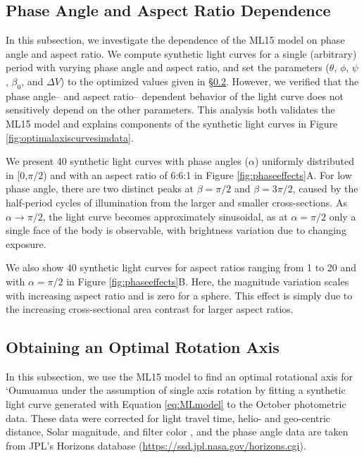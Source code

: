 \documentclass[twocolumn,doublespacing]{aastex631}
\begin{document}
\subsection{Phase Angle and Aspect Ratio Dependence}\label{subsec:phaseaspectanalysis}

In this subsection, we investigate the dependence of the ML15 model on phase angle and aspect ratio. We compute synthetic light curves for a single (arbitrary) period with varying phase angle and aspect ratio, and set the parameters ($\theta$, $\phi$, $\psi$, $\beta_0$, and $\Delta V$) to the optimized values given in \S \ref{subsec:gettingaxis}. However, we verified that the phase angle-- and aspect ratio-- dependent behavior of the light curve does not sensitively depend on the other parameters. This analysis both validates the ML15 model and explains components of the synthetic light curves in Figure \ref{fig:optimalaxiscurvesimdata}. 

We present 40 synthetic light curves with phase angles ($\alpha$) uniformly distributed in [$0$,$\pi/2$) and with an aspect ratio of 6:6:1 in Figure \ref{fig:phaseeffects}A. For low phase angle, there are two distinct peaks at $\beta=\pi/2$ and $\beta=3\pi/2$, caused by the half-period cycles of illumination from the larger and smaller cross-sections. As $\alpha\rightarrow\pi/2$, the light curve becomes approximately sinusoidal, as at $\alpha=\pi/2$ only a single face of the body is observable, with brightness variation due to changing exposure. 

We also show 40 synthetic light curves for aspect ratios ranging from 1 to 20 and with $\alpha=\pi/2$ in Figure \ref{fig:phaseeffects}B. Here, the magnitude variation scales with increasing aspect ratio and is zero for a sphere. This effect is simply due to the increasing cross-sectional area contrast for larger aspect ratios. 

\subsection{Obtaining an Optimal Rotation Axis}\label{subsec:gettingaxis}

In this subsection, we use the ML15 model to find an optimal rotational axis for `Oumuamua under the assumption of single axis rotation by fitting a synthetic light curve generated with Equation \ref{eq:MLmodel} to the October photometric data. These data were corrected for light travel time, helio- and geo-centric distance, Solar magnitude, and filter color \citep{belton2018}, and the phase angle data are taken from JPL's Horizons database (\url{https://ssd.jpl.nasa.gov/horizons.cgi}). 
\end{document}

